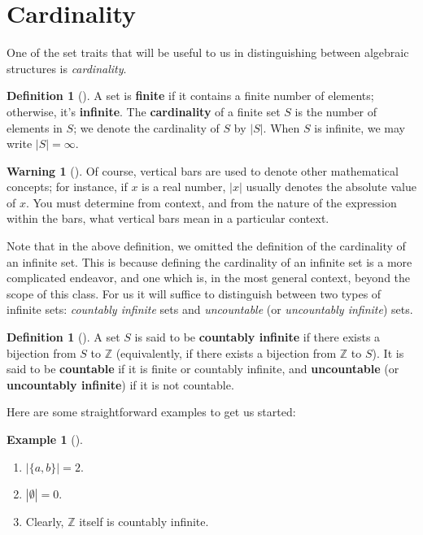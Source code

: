 \documentclass[10pt,]{book}
\newcommand{\terminology}[1]{\textbf{#1}}
\theoremstyle{plain}
\theoremstyle{definition}
\newtheorem{definition}[theorem]{Definition}
\theoremstyle{definition}
\newtheorem{warning}[theorem]{Warning}
\theoremstyle{definition}
\newtheorem{example}[theorem]{Example}
\theoremstyle{definition}
\numberwithin{equation}{section}
\def\Z{\mathbb{Z}}
\begin{document}
\section[{Cardinality}]{Cardinality}\label{card}
One of the set traits that will be useful to us in distinguishing between algebraic structures is \emph{cardinality}.%
\begin{definition}[{}]\label{definition-12}
\label{notation-29}
 A set is \terminology{finite} if it contains a finite number of elements; otherwise, it's \terminology{infinite}. The \terminology{cardinality} of a finite set \(S\) is the number of elements in \(S\); we denote the cardinality of \(S\) by \(|S|\). When \(S\) is infinite, we may write \(|S|=\infty\).%
\end{definition}
\begin{warning}[]\label{warning-3}
Of course, vertical bars are used to denote other mathematical concepts; for instance, if \(x\) is a real number, \(|x|\) usually denotes the absolute value of \(x\). You must determine from context, and from the nature of the expression within the bars, what vertical bars mean in a particular context.%
\end{warning}
Note that in the above definition, we omitted the definition of the cardinality of an infinite set.  This is because defining the cardinality of an infinite set is a more complicated endeavor, and one which is, in the most general context, beyond the scope of this class.  For us it will suffice to distinguish between two types of infinite sets: \emph{countably infinite} sets and \emph{uncountable} (or \emph{uncountably infinite}) sets.%
\begin{definition}[{}]\label{definition-13}
A set \(S\) is said to be \terminology{countably infinite} if there exists a bijection from \(S\) to \(\Z\) (equivalently, if there exists a bijection from \(\Z\) to \(S\)). It is said to be \terminology{countable} if it is finite or countably infinite, and \terminology{uncountable} (or \terminology{uncountably infinite}) if it is not countable.%
\end{definition}
Here are some straightforward examples to get us started:%
\begin{example}[]\label{example-8}
\leavevmode%
\begin{enumerate}
\item\hypertarget{li-16}{}\(|\{a,b\}|=2\).%
\item\hypertarget{li-17}{}\(|\emptyset|=0\).%
\item\hypertarget{li-18}{}Clearly, \(\Z\) itself is countably infinite.%
\end{enumerate}
%
\end{example}
\end{document}
